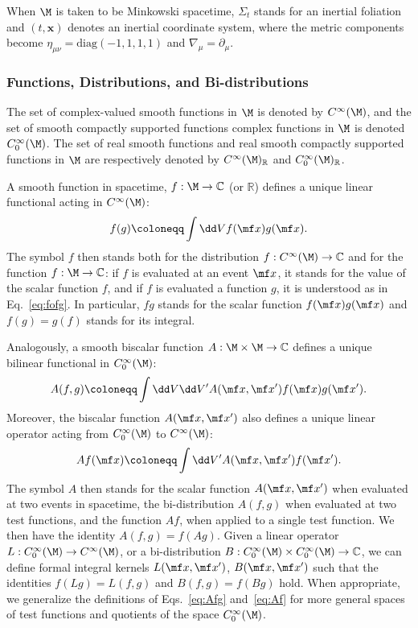 When $\M$ is taken to be Minkowski spacetime, $\Sigma_t$ stands for an inertial foliation and $(t,\bm x)$ denotes an inertial coordinate system, where the metric components become $\eta_{\mu\nu} = \text{diag}(-1,1,1,1)$ and $\nabla_\mu = \partial_\mu$.

\subsubsection*{Functions, Distributions, and Bi-distributions}

The set of complex-valued smooth functions in $\M$ is denoted by $C^\infty(\M)$, and the set of smooth compactly supported functions complex functions in $\M$ is denoted $C_0^\infty(\M)$. The set of real smooth functions and real smooth compactly supported functions in $\M$ are respectively denoted by  $C^\infty(\M)_\mathbb{R}$ and $C_0^\infty(\M)_\mathbb{R}$.

A smooth function in spacetime, $f:\M\to \mathbb{C}$ (or $\mathbb{R}$) defines a unique linear functional acting in $C^\infty(\M)$:
\begin{equation}\label{eq:fofg}
    f(g) \coloneqq \int \dd V f(\mf x) g(\mf x).
\end{equation}
The symbol $f$ then stands both for the distribution $f:C^\infty(\M)\to \mathbb{C}$ and for the function $f:\M\to \mathbb{C}$: if $f$ is evaluated at an event $\mf x$, it stands for the value of the scalar function $f$, and if $f$ is evaluated a function $g$, it is understood as in Eq.~\eqref{eq:fofg}. In particular, $fg$ stands for the scalar function $f(\mf x)g(\mf x)$ and $f(g) = g(f)$ stands for its integral.

Analogously, a smooth biscalar function $A:\M\times\M\to \mathbb{C}$ defines a unique bilinear functional in $C_0^\infty(\M)$:
\begin{equation}\label{eq:Afg}
    A(f,g) \coloneqq \int \dd V \dd V' A(\mf x, \mf x') f(\mf x) g(\mf x').
\end{equation}
Moreover, the biscalar function $A(\mf x, \mf x')$ also defines a unique linear operator acting from $C_0^\infty(\M)$ to $C^\infty(\M)$:
\begin{equation}\label{eq:Af}
    Af(\mf x) \coloneqq \int \dd V' A(\mf x, \mf x') f(\mf x').
\end{equation}
The symbol $A$ then stands for the scalar function $A(\mf x, \mf x')$ when evaluated at two events in spacetime, the bi-distribution $A(f,g)$ when evaluated at two test functions, and the function $Af$, when applied to a single test function. We then have the identity $A(f,g) = f(Ag)$. Given a linear operator $L:C_0^\infty(\M)\to C^\infty(\M)$, or a bi-distribution $B:C_0^\infty(\M)\times C_0^\infty(\M) \to \mathbb{C}$, we can define formal integral kernels $L(\mf x, \mf x')$, $B(\mf x, \mf x')$ such that the identities $f(Lg) = L(f,g)$ and $B(f,g) = f(Bg)$ hold. When appropriate, we generalize the definitions of Eqs.~\eqref{eq:Afg} and~\eqref{eq:Af} for more general spaces of test functions and quotients of the space $C_0^\infty(\M)$. 

